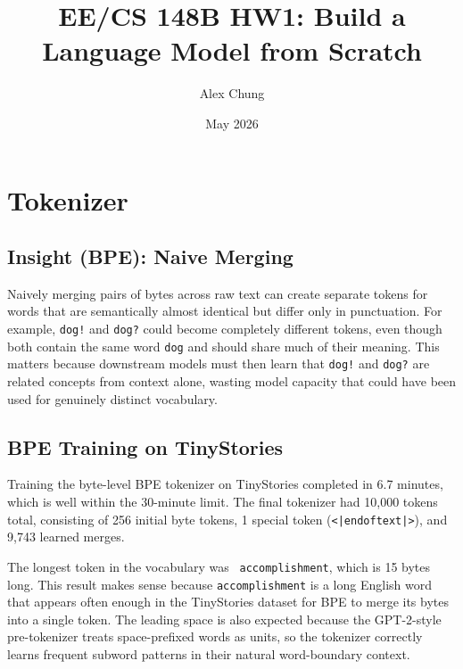 \documentclass{article}
\title{EE/CS 148B HW1: Build a Language Model from Scratch}
\author{Alex Chung}
\date{May 2026}
\begin{document}
\maketitle
\tableofcontents
\newpage

\section{Tokenizer}

\subsection{Insight (BPE): Naive Merging}

Naively merging pairs of bytes across raw text can create separate tokens for
words that are semantically almost identical but differ only in punctuation.
For example, \texttt{dog!} and \texttt{dog?} could become completely different
tokens, even though both contain the same word \texttt{dog} and should share
much of their meaning.  This matters because downstream models must then learn
that \texttt{dog!} and \texttt{dog?} are related concepts from context alone,
wasting model capacity that could have been used for genuinely distinct
vocabulary.

\subsection{BPE Training on TinyStories}

Training the byte-level BPE tokenizer on TinyStories completed in 6.7 minutes,
which is well within the 30-minute limit.  The final tokenizer had
10{,}000 tokens total, consisting of 256 initial byte tokens, 1 special token
(\texttt{<|endoftext|>}), and 9{,}743 learned merges.

The longest token in the vocabulary was \texttt{ accomplishment}, which is
15 bytes long.  This result makes sense because \texttt{accomplishment} is a
long English word that appears often enough in the TinyStories dataset for BPE
to merge its bytes into a single token.  The leading space is also expected
because the GPT-2-style pre-tokenizer treats space-prefixed words as units,
so the tokenizer correctly learns frequent subword patterns in their natural
word-boundary context.

\end{document}
